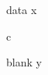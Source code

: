 \documentclass{article}
\begin{document}
\begin{algorithmic}[1]
\REQUIRE data
\STATE x
\item[{a]b}] c
\item[] blank
\STATE y
\end{algorithmic}
\end{document}
